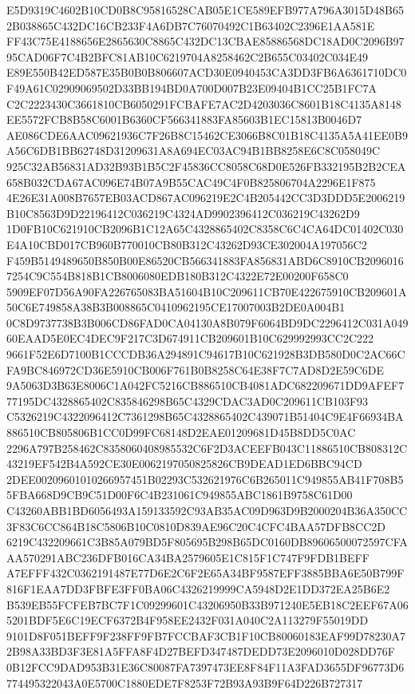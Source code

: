 \documentclass[UTF8,fontset=fandol,zihao=-4,a4paper]{ctexart}
\begin{document}
{{E5D9319C4602B10CD0B8C95816528CAB05E1CE589EFB977A796A3015D48B652B038865C432DC16CB233F4A6DB7C76070492C1B63402C2396E1AA581E
FF43C75E4188656E2865630C8865C432DC13CBAE85886568DC18AD0C2096B9795CAD06F7C4B2BFC81AB10C6219704A8258462C2B655C03402C034E49
E89E550B42ED587E35B0B0B806607ACD30E0940453CA3DD3FB6A6361710DC0F49A61C02909069502D33BB194BD0A700D007B23E09404B1CC25B1FC7A
C2C2223430C3661810CB6050291FCBAFE7AC2D4203036C8601B18C4135A8148EE5572FCB8B58C6001B6360CF566341883FA85603B1EC15813B0046D7
AE086CDE6AAC09621936C7F26B8C15462CE3066B8C01B18C4135A5A41EE0B9A56C6DB1BB62748D31209631A8A694EC03AC94B1BB8258E6C8C058049C
925C32AB56831AD32B93B1B5C2F45836CC8058C68D0E526FB332195B2B2CEA658B032CDA67AC096E74B07A9B55CAC49C4F0B825806704A2296E1F875
4E26E31A008B7657EB03ACD867AC096219E2C4B205442CC3D3DDD5E2006219B10C8563D9D22196412C036219C4324AD9902396412C036219C43262D9
1D0FB10C621910CB2096B1C12A65C4328865402C8358C6C4CA64DC01402C030E4A10CBD017CB960B770010CB80B312C43262D93CE302004A197056C2
F459B5149489650B850B00E86520CB566341883FA856831ABD6C8910CB20960167254C9C554B818B1CB8006080EDB180B312C4322E72E00200F658C0
5909EF07D56A90FA226765083BA51604B10C209611CB70E422675910CB209601A50C6E749858A38B3B008865C0410962195CE17007003B2DE0A004B1
0C8D9737738B3B006CD86FAD0CA04130A8B079F6064BD9DC2296412C031A04960EAAD5E0EC4DEC9F217C3D674911CB209601B10C629992993CC2C222
9661F52E6D7100B1CCCDB36A294891C94617B10C621928B3DB580D0C2AC66CFA9BC846972CD36E5910CB006F761B0B8258C64E38F7C7AD8D2E59C6DE
9A5063D3B63E8006C1A042FC5216CB886510CB4081ADC682209671DD9AFEF777195DC4328865402C835846298B65C4329CDAC3AD0C209611CB103F93
C5326219C4322096412C7361298B65C4328865402C439071B51404C9E4F66934BA886510CB805806B1CC0D99FC68148D2EAE01209681D45B8DD5C0AC
2296A797B258462C8358060408985532C6F2D3ACEEFB043C11886510CB808312C43219EF542B4A592CE30E0062197050825826CB9DEAD1ED6BBC94CD
2DEE00209601010266957451B02293C532621976C6B265011C949855AB41F708B55FBA668D9CB9C51D00F6C4B231061C949855ABC1861B9758C61D00
C43260ABB1BD6056493A159133592C93AB35AC09D963D9B2000204B36A350CC3F83C6CC864B18C5806B10C0810D839AE96C20C4CFC4BAA57DFB8CC2D
6219C432209661C3B85A079BD5F805695B298B65DC0160DB89606500072597CFAAA570291ABC236DFB016CA34BA2579605E1C815F1C747F9FDB1BEFF
A7EFFF432C0362191487E77D6E2C6F2E65A34BF9587EFF3885BBA6E50B799F816F1EAA7DD3FBFE3FF0BA06C4326219999CA5948D2E1DD372EA25B6E2
B539EB55FCFEB7BC7F1C09299601C43206950B33B971240E5EB18C2EEF67A065201BDF5E6C19ECF6372B4F958EE2432F031A040C2A113279F55019DD
9101D8F051BEFF9F238FF9FB7FCCBAF3CB1F10CB80060183EAF99D78230A72B98A33BD3F3E81A5FFA8F4D27BEFD347487DEDD73E2096010D028DD76F
0B12FCC9DAD953B31E36C80087FA7397473EE8F84F11A3FAD3655DF96773D6774495322043A0E5700C1880EDE7F8253F72B93A93B9F64D226B727317
}}
\end{document}
